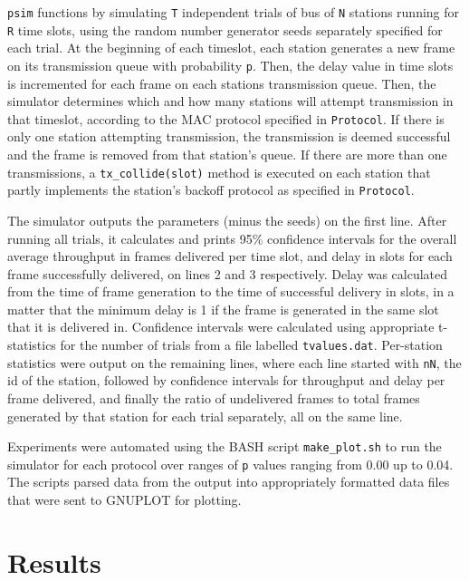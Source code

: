 \documentclass[twocolumn]{article}
\begin{document}
\verb|psim| functions by simulating \verb|T| independent trials of bus of
\verb|N| stations running for \verb|R| time slots, using the random number
generator seeds separately specified for each trial. At the beginning of each
timeslot, each station generates a new frame on its transmission queue with
probability \verb|p|. Then, the delay value in time slots is incremented for
each frame on each stations transmission queue.  Then, the simulator determines
which and how many stations will attempt transmission in that timeslot,
according to the MAC protocol specified in \verb|Protocol|. If there is only one
station attempting transmission, the transmission is deemed successful and the
frame is removed from that station's queue. If there are more than one
transmissions, a \verb|tx_collide(slot)| method is executed on each station that
partly implements the station's backoff protocol as specified in
\verb|Protocol|.

The simulator outputs the parameters (minus the seeds) on the first line. After
running all trials, it calculates and prints 95\% confidence intervals for the
overall average throughput in frames delivered per time slot, and delay in slots
for each frame successfully delivered, on lines 2 and 3 respectively. Delay was 
calculated from the time of frame generation to the time of successful delivery in slots,
in a matter that the minimum delay is 1 if the frame is generated in the same slot that it is
delivered in. Confidence
intervals were calculated using appropriate t-statistics for the number of
trials from a file labelled \verb|tvalues.dat|. Per-station statistics were output
on the remaining lines, where each line started with \verb|nN|, the id of the station,
followed by confidence intervals for throughput and delay per frame delivered, and finally
the ratio of undelivered frames to total frames generated by that station for each trial 
separately, all on the same line.

Experiments were automated using the BASH script \verb|make_plot.sh| 
to run the simulator for each protocol over ranges of \verb|p| values ranging
from 0.00 up to 0.04. The scripts parsed data from the output into appropriately
formatted data files that were sent to GNUPLOT for plotting.

\section*{Results}
\end{document}
